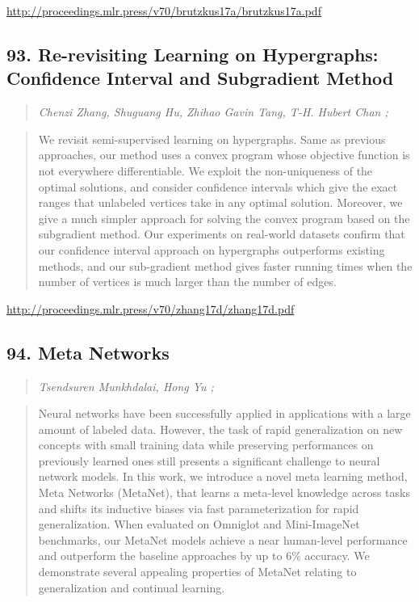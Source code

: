 \documentclass{article}
\begin{document}
\href{http://proceedings.mlr.press/v70/brutzkus17a/brutzkus17a.pdf}{http://proceedings.mlr.press/v70/brutzkus17a/brutzkus17a.pdf}

\subsection{93. Re-revisiting Learning on Hypergraphs: Confidence Interval and Subgradient Method}

\begin{quote}
\footnotesize{\textit{Chenzi Zhang, Shuguang Hu, Zhihao Gavin Tang, T-H. Hubert Chan ;}}
\end{quote}

\begin{quote}
    We revisit semi-supervised learning on hypergraphs. Same as previous approaches, our method uses a convex program whose objective function is not everywhere differentiable. We exploit the non-uniqueness of the optimal solutions, and consider confidence intervals which give the exact ranges that unlabeled vertices take in any optimal solution. Moreover, we give a much simpler approach for solving the convex program based on the subgradient method. Our experiments on real-world datasets confirm that our confidence interval approach on hypergraphs outperforms existing methods, and our sub-gradient method gives faster running times when the number of vertices is much larger than the number of edges.  \end{quote}

\href{http://proceedings.mlr.press/v70/zhang17d/zhang17d.pdf}{http://proceedings.mlr.press/v70/zhang17d/zhang17d.pdf}

\subsection{94. Meta Networks}

\begin{quote}
\footnotesize{\textit{Tsendsuren Munkhdalai, Hong Yu ;}}
\end{quote}

\begin{quote}
    Neural networks have been successfully applied in applications with a large amount of labeled data. However, the task of rapid generalization on new concepts with small training data while preserving performances on previously learned ones still presents a significant challenge to neural network models. In this work, we introduce a novel meta learning method, Meta Networks (MetaNet), that learns a meta-level knowledge across tasks and shifts its inductive biases via fast parameterization for rapid generalization. When evaluated on Omniglot and Mini-ImageNet benchmarks, our MetaNet models achieve a near human-level performance and outperform the baseline approaches by up to 6\% accuracy. We demonstrate several appealing properties of MetaNet relating to generalization and continual learning.  \end{quote}
\end{document}
